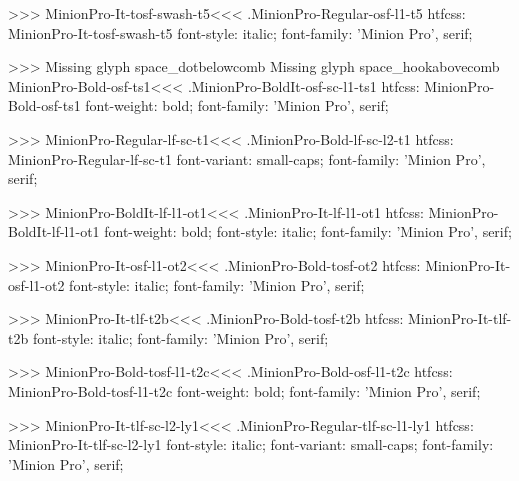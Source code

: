 {>>>
\<MinionPro-It-tosf-swash-t5\><<<
.MinionPro-Regular-osf-l1-t5
htfcss:  MinionPro-It-tosf-swash-t5  font-style: italic; font-family: 'Minion Pro', serif;

>>>
Missing glyph	space_dotbelowcomb
Missing glyph	space_hookabovecomb
\<MinionPro-Bold-osf-ts1\><<<
.MinionPro-BoldIt-osf-sc-l1-ts1
htfcss:  MinionPro-Bold-osf-ts1  font-weight: bold; font-family: 'Minion Pro', serif;

>>>
\<MinionPro-Regular-lf-sc-t1\><<<
.MinionPro-Bold-lf-sc-l2-t1
htfcss:  MinionPro-Regular-lf-sc-t1  font-variant: small-caps; font-family: 'Minion Pro', serif;

>>>
\<MinionPro-BoldIt-lf-l1-ot1\><<<
.MinionPro-It-lf-l1-ot1
htfcss:  MinionPro-BoldIt-lf-l1-ot1  font-weight: bold; font-style: italic; font-family: 'Minion Pro', serif;

>>>
\<MinionPro-It-osf-l1-ot2\><<<
.MinionPro-Bold-tosf-ot2
htfcss:  MinionPro-It-osf-l1-ot2  font-style: italic; font-family: 'Minion Pro', serif;

>>>
\<MinionPro-It-tlf-t2b\><<<
.MinionPro-Bold-tosf-t2b
htfcss:  MinionPro-It-tlf-t2b  font-style: italic; font-family: 'Minion Pro', serif;

>>>
\<MinionPro-Bold-tosf-l1-t2c\><<<
.MinionPro-Bold-osf-l1-t2c
htfcss:  MinionPro-Bold-tosf-l1-t2c  font-weight: bold; font-family: 'Minion Pro', serif;

>>>
\<MinionPro-It-tlf-sc-l2-ly1\><<<
.MinionPro-Regular-tlf-sc-l1-ly1
htfcss:  MinionPro-It-tlf-sc-l2-ly1  font-style: italic; font-variant: small-caps; font-family: 'Minion Pro', serif;

}
